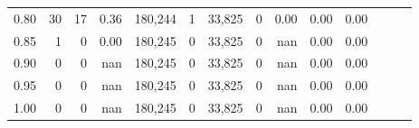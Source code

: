 \begin{tabular}{rrrrrrrrrrrrrr}
0.80 &      30 &     17 &  0.36 &  180,244 &        1 &  33,825 &       0 &  0.00 &  0.00 &      0.00 \\
0.85 &       1 &      0 &  0.00 &  180,245 &        0 &  33,825 &       0 &   nan &  0.00 &      0.00 \\
0.90 &       0 &      0 &   nan &  180,245 &        0 &  33,825 &       0 &   nan &  0.00 &      0.00 \\
0.95 &       0 &      0 &   nan &  180,245 &        0 &  33,825 &       0 &   nan &  0.00 &      0.00 \\
1.00 &       0 &      0 &   nan &  180,245 &        0 &  33,825 &       0 &   nan &  0.00 &      0.00 \\
\bottomrule
\end{tabular}
